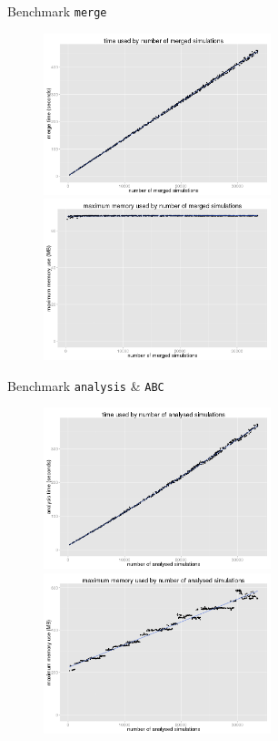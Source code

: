 \documentclass[10pt, aspectratio=43]{beamer}
\begin{document}
\begin{frame}[noframenumbering]{}{Benchmark \texttt{merge}}
\begin{figure}
  \hspace*{-1cm}
  \includegraphics[width=0.59\textwidth]{../data/merge-timeByNSimulations.png}%
  \includegraphics[width=0.59\textwidth]{../data/merge-maxMemByNSimulations.png}
\end{figure}
\end{frame}

\begin{frame}[noframenumbering]{}{Benchmark \texttt{analysis} \& \texttt{ABC}}
\begin{figure}
  \hspace*{-1cm}
  \includegraphics[width=0.59\textwidth]{../data/analysis-timeByNSimulations.png}%
  \includegraphics[width=0.59\textwidth]{../data/analysis-maxMemByNSimulations.png}
\end{figure}
\end{frame}
\end{document}
